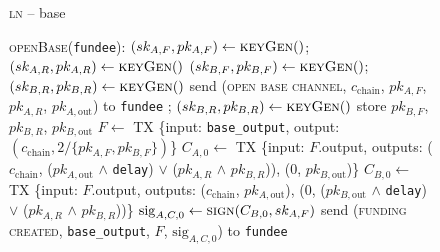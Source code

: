 \begin{figure}[H]
  \begin{processbox}{\textsc{ln} -- base}
    \begin{algorithmic}[1]
      \State \textsc{openBase}(\texttt{fundee}):
      \Indent
        \State $(sk_{A, F}, pk_{A, F}) \gets \textsc{keyGen}()$;
        $(sk_{A, R}, pk_{A, R}) \gets \textsc{keyGen}()$
          \State $(sk_{B, F}, pk_{B, F}) \gets \textsc{keyGen}()$; $(sk_{B, R},
          pk_{B, R}) \gets \textsc{keyGen}()$
        \Else \: 
          \State send (\textsc{open base channel}, $c_{\mathrm{chain}}$, $pk_{A,
          F}$, $pk_{A, R}$, $pk_{A, \mathrm{out}}$) to \texttt{fundee}
          \State {}
          \State {}
          \State {}
          \State {};
          $(sk_{B, R}, pk_{B, R}) \gets \textsc{keyGen}()$
          \State {}
          \State store $pk_{B, F}$, $pk_{B, R}$, $pk_{B, \mathrm{out}}$
        \EndIf
        \State $F \gets$ TX \{input: \texttt{base\_output}, output:
        $(c_{\mathrm{chain}}, 2/\{pk_{A, F}, pk_{B, F}\})$\}
          \State $C_{A, 0} \gets$ TX \{input: $F$.output, outputs:
          ($c_{\mathrm{chain}}$, ($pk_{A, \mathrm{out}}$ $\wedge$
          \texttt{delay}) $\vee$ ($pk_{A, R}$ $\wedge$ $pk_{B, R}$)), ($0$,
          $pk_{B, \mathrm{out}}$)\}
          \State $C_{B, 0} \gets$ TX \{input: $F$.output, outputs:
          ($c_{\mathrm{chain}}$, $pk_{A, \mathrm{out}}$), ($0$, ($pk_{B,
          \mathrm{out}}$ $\wedge$ \texttt{delay}) $\vee$ ($pk_{A, R}$ $\wedge$
          $pk_{B, R}$))\}
          \State $\mathrm{sig}_{A, C, 0} \gets \textsc{sign}(C_{B, 0}, sk_{A,
          F})$
          \State send (\textsc{funding created}, \texttt{base\_output},
          $F$, $\mathrm{sig}_{A, C, 0}$) to \texttt{fundee}
          \State {}
          \State {}
          \State {}
\end{algorithmic}
\end{processbox}
\end{figure}
